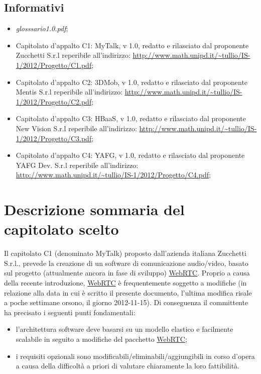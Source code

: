 \subsection{Informativi}
\begin{itemize}
\item[] \textit{glosssario1.0.pdf};
\item[] Capitolato d'appalto C1: MyTalk, v 1.0, redatto e rilasciato dal proponente Zucchetti S.r.l reperibile all'indirizzo: \url{http://www.math.unipd.it/~tullio/IS-1/2012/Progetto/C1.pdf};
\item[] Capitolato d'appalto C2: 3DMob, v 1.0, redatto e rilasciato dal proponente Mentis S.r.l reperibile all'indirizzo: \url{http://www.math.unipd.it/~tullio/IS-1/2012/Progetto/C2.pdf};
\item[] Capitolato d'appalto C3: HBaaS, v 1.0, redatto e rilasciato dal proponente New Vision S.r.l reperibile all'indirizzo: \url{http://www.math.unipd.it/~tullio/IS-1/2012/Progetto/C3.pdf};
\item[] Capitolato d'appalto C4: YAFG, v 1.0, redatto e rilasciato dal proponente YAFG Dev. S.r.l reperibile all'indirizzo: \url{http://www.math.unipd.it/~tullio/IS-1/2012/Progetto/C4.pdf};
\end{itemize}
\clearpage
\section{Descrizione sommaria del capitolato scelto}
Il capitolato C1 (denominato MyTalk) proposto dall'azienda italiana Zucchetti S.r.l., prevede la creazione di un software di comunicazione audio/video, basato sul progetto (attualmente ancora in fase di sviluppo) \underline{WebRTC}. Proprio a causa della recente introduzione, \underline{WebRTC} è frequentemente soggetto a modifiche (in relazione alla data in cui è scritto il presente documento, l'ultima modifica risale a poche settimane orsono, il giorno 2012-11-15). Di conseguenza il committente ha precisato i seguenti punti fondamentali:

\begin{itemize}
	\item l'architettura software deve basarsi su un modello elastico e facilmente scalabile in seguito a modifiche del pacchetto \underline{WebRTC};
	\item i requisiti opzionali sono modificabili/eliminabili/aggiungibili in corso d'opera a causa della difficoltà a priori di valutare chiaramente la loro fattibilità.
\end{itemize}

